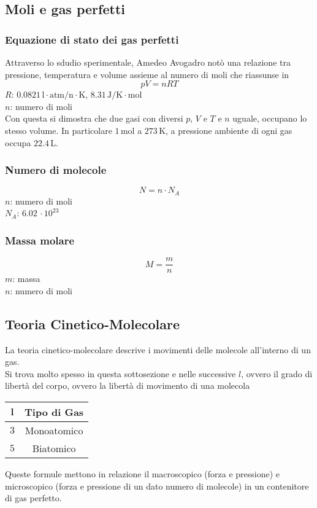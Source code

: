 \subsection{Moli e gas perfetti}

\subsubsection{Equazione di stato dei gas perfetti}
Attraverso lo sdudio sperimentale, Amedeo Avogadro notò una relazione tra pressione, temperatura
e volume assieme al numero di moli che riassunse in
\begin{equation*}
  pV = nRT
\end{equation*}
\hyperref[tab:R]{$R$}: $0.0821\,\text{l}\cdot\text{atm/n}\cdot\text{K}$,
$8.31\,\text{J/K}\cdot\text{mol}$\\
$n$: numero di moli\\ [\baselineskip]
Con questa si dimostra che due gasi con diversi $p$, $V$ e $T$ e $n$ uguale, occupano lo stesso 
volume. In particolare $1\,\text{mol}$ a $273\,\text{K}$, a pressione ambiente di ogni gas occupa
$22.4\,\text{L}$.

\subsubsection{Numero di molecole}
\begin{equation*}
  N = n \cdot N_A
\end{equation*}
$n$: numero di moli\\
\hyperref[tab:Na]{$N_A$}: $6.02\,\cdot10^{23}$

\subsubsection{Massa molare}
\begin{equation*}
  M = \frac{m}{n}
\end{equation*}
$m$: massa\\
$n$: numero di moli

\subsection{Teoria Cinetico-Molecolare}
La teoria cinetico-molecolare descrive i movimenti delle molecole all'interno di un gas.\\
Si trova molto spesso in questa sottosezione e nelle successive $l$, ovvero il grado di libertà 
del corpo, ovvero la libertà di movimento di una molecola\\
\begin{center}
  \begin{tabular}{c c}
    $\boldsymbol{l}$ & \textbf{Tipo di Gas}\\ \hline
    $3$ & Monoatomico \\ \hline
    $5$ & Biatomico\\
  \end{tabular}
\end{center}
Queste formule mettono in relazione il macroscopico (forza e pressione) e microscopico (forza e 
pressione di un dato numero di molecole) in un contenitore di gas perfetto.

